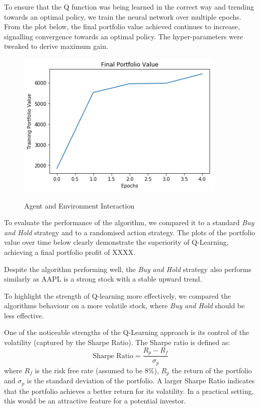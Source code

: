 \documentclass[12pt, authoryear]{elsarticle}
\begin{document}
To ensure that the Q function was being learned in the correct way and trending towards an optimal policy, we train the neural network over multiple epochs. From the plot below, the final portfolio value achieved continues to increase, signalling convergence towards an optimal policy. The hyper-parameters were tweaked to derive maximum gain. 

\begin{figure}[h!]
	\centering
	\caption{Agent and Environment Interaction}
	\includegraphics[clip, angle=0, width=10cm]{figures/training.png}
	\label{fig:1}
\end{figure}

To evaluate the performance of the algorithm, we compared it to a standard \textit{Buy and Hold} strategy and to a randomised action strategy. The plots of the portfolio value over time below clearly demonstrate the superiority of Q-Learning, achieving a final portfolio profit of XXXX.

Despite the algorithm performing well, the \textit{Buy and Hold} strategy also performs similarly as AAPL is a strong stock with a stable upward trend.



To highlight the strength of Q-learning more effectively, we compared the algorithms behaviour on a more volatile stock, where \textit{Buy and Hold} should be less effective.

One of the noticeable strengths of the Q-Learning approach is its control of the volatility (captured by the Sharpe Ratio). The Sharpe ratio is defined as:
$$
\text {Sharpe Ratio} = \frac { R _ { p } - R _ { f } } { \sigma _ { p } }
$$
where $R_{f}$ is the risk free rate (assumed to be 8\%), $R_{p}$ the return of the portfolio and $\sigma_{p}$ is the standard deviation of the portfolio. A larger Sharpe Ratio indicates that the portfolio achieves a better return for its volatility.
In a practical setting, this would be an attractive feature for a potential investor.
\end{document}
